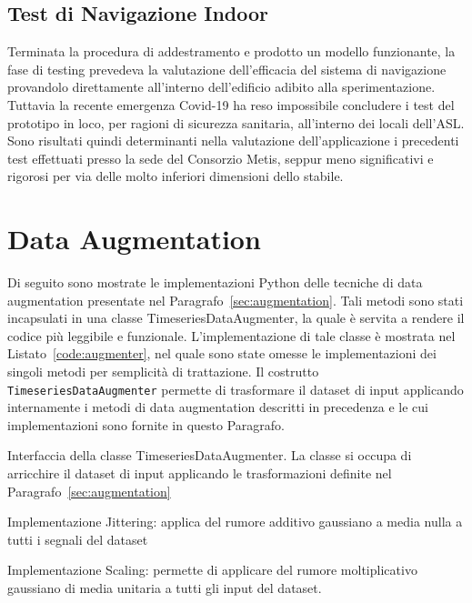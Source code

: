 \subsection{Test di Navigazione Indoor}
Terminata la procedura di addestramento e prodotto un modello funzionante, la
fase di testing prevedeva la valutazione dell'efficacia del sistema di
navigazione provandolo direttamente all'interno dell'edificio adibito alla
sperimentazione. Tuttavia la recente emergenza Covid-19 ha reso impossibile
concludere i test del prototipo in loco, per ragioni di sicurezza sanitaria,
all'interno dei locali dell'ASL\@. Sono risultati quindi determinanti nella
valutazione dell'applicazione i precedenti test effettuati presso la sede del
Consorzio Metis, seppur meno significativi e rigorosi per via delle molto
inferiori dimensioni dello stabile.

\section{Data Augmentation}
Di seguito sono mostrate le implementazioni Python delle tecniche di data
augmentation presentate nel Paragrafo~\ref{sec:augmentation}. Tali metodi sono
stati incapsulati in una classe TimeseriesDataAugmenter, la quale è servita a
rendere il codice più leggibile e funzionale. L'implementazione di tale classe
è mostrata nel Listato~\ref{code:augmenter}, nel quale sono state omesse le
implementazioni dei singoli metodi per semplicità di trattazione. Il costrutto
\texttt{TimeseriesDataAugmenter} permette di trasformare il dataset
di input applicando internamente i metodi di data augmentation descritti in
precedenza e le cui implementazioni sono fornite in questo Paragrafo.

\begin{listing}[p]
	\caption{Interfaccia della classe TimeseriesDataAugmenter. La classe si
		occupa di arricchire il dataset di input applicando le trasformazioni
		definite nel Paragrafo~\ref{sec:augmentation}}
  \label{code:augmenter}
\end{listing}

\begin{listing}[p]
	\caption{Implementazione Jittering: applica del rumore additivo gaussiano a
    media nulla a tutti i segnali del dataset}
  \label{code:jitter}
\end{listing}

\begin{listing}[p]
	\caption{Implementazione Scaling: permette di applicare del rumore
    moltiplicativo gaussiano di media unitaria a tutti gli input del dataset.}
  \label{code:scaling}
\end{listing}

